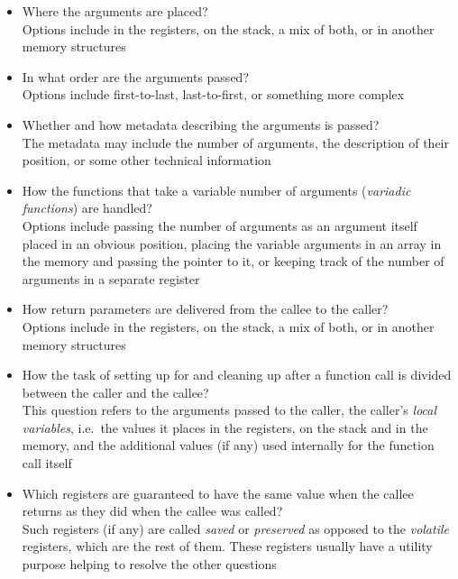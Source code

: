 \begin{itemize}
    \item Where the arguments are placed? \\
    Options include in the registers, on the stack, a mix of both,
    or in another memory structures

    \item In what order are the arguments passed? \\
    Options include first-to-last, last-to-first, or something more complex

    \item Whether and how metadata describing the arguments is passed? \\
    The metadata may include the number of arguments, the description
    of their position, or some other technical information

    \item How the functions that take a variable number of arguments
    (\textit{variadic functions}) are handled? \\
    Options include passing the number of arguments as an argument
    itself placed in an obvious position, placing the variable arguments
    in an array in the memory and passing the pointer to it, or keeping
    track of the number of arguments in a separate register

    \item How return parameters are delivered from the callee to the caller? \\
    Options include in the registers, on the stack, a mix of both,
    or in another memory structures

    \item How the task of setting up for and cleaning up after
    a function call is divided between the caller and the callee? \\
    This question refers to the arguments passed to the caller,
    the caller's \textit{local variables}, i.e.\ the values it places
    in the registers, on the stack and in the memory, and the additional
    values (if any) used internally for the function call itself

    \item Which registers are guaranteed to have the same value
    when the callee returns as they did when the callee was called? \\
    Such registers (if any) are called \textit{saved} or \textit{preserved}
    as opposed to the \textit{volatile} registers, which are the rest of them.
    These registers usually have a utility purpose helping to resolve the other
    questions
\end{itemize}

